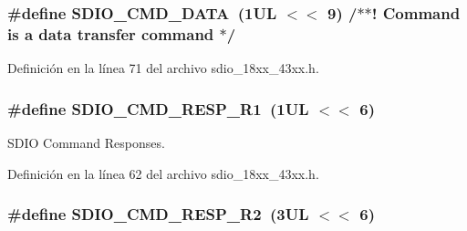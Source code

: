 \subsubsection[{\texorpdfstring{S\+D\+I\+O\+\_\+\+C\+M\+D\+\_\+\+D\+A\+TA}{SDIO_CMD_DATA}}]{\setlength{\rightskip}{0pt plus 5cm}\#define S\+D\+I\+O\+\_\+\+C\+M\+D\+\_\+\+D\+A\+TA~(1\+U\+L $<$$<$ 9)  /$\ast$$\ast$! Command is a data transfer command $\ast$/}\hypertarget{group___s_d_i_o__18_x_x__43_x_x_gaca11da76712b05c2717f87d22cb595ec}{}\label{group___s_d_i_o__18_x_x__43_x_x_gaca11da76712b05c2717f87d22cb595ec}


Definición en la línea 71 del archivo sdio\+\_\+18xx\+\_\+43xx.\+h.

\subsubsection[{\texorpdfstring{S\+D\+I\+O\+\_\+\+C\+M\+D\+\_\+\+R\+E\+S\+P\+\_\+\+R1}{SDIO_CMD_RESP_R1}}]{\setlength{\rightskip}{0pt plus 5cm}\#define S\+D\+I\+O\+\_\+\+C\+M\+D\+\_\+\+R\+E\+S\+P\+\_\+\+R1~(1\+U\+L $<$$<$ 6)}\hypertarget{group___s_d_i_o__18_x_x__43_x_x_ga74936e4059fa646fdd3a62c68252e3bc}{}\label{group___s_d_i_o__18_x_x__43_x_x_ga74936e4059fa646fdd3a62c68252e3bc}


S\+D\+IO Command Responses. 



Definición en la línea 62 del archivo sdio\+\_\+18xx\+\_\+43xx.\+h.

\subsubsection[{\texorpdfstring{S\+D\+I\+O\+\_\+\+C\+M\+D\+\_\+\+R\+E\+S\+P\+\_\+\+R2}{SDIO_CMD_RESP_R2}}]{\setlength{\rightskip}{0pt plus 5cm}\#define S\+D\+I\+O\+\_\+\+C\+M\+D\+\_\+\+R\+E\+S\+P\+\_\+\+R2~(3\+U\+L $<$$<$ 6)}\hypertarget{group___s_d_i_o__18_x_x__43_x_x_gae08429760806cb077de3a65bf22fc11a}{}\label{group___s_d_i_o__18_x_x__43_x_x_gae08429760806cb077de3a65bf22fc11a}


